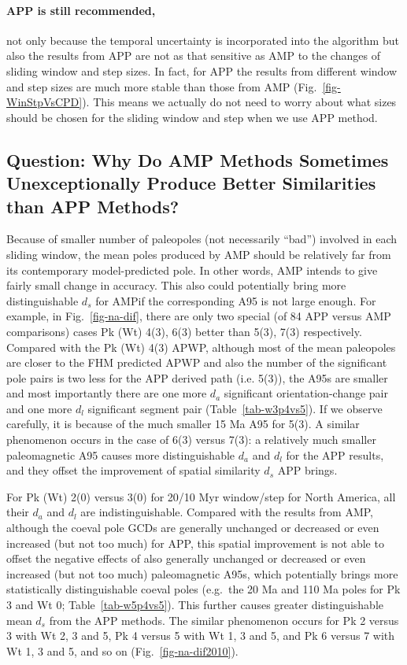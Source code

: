 \paragraph{APP is still recommended,} not only because the temporal uncertainty
is incorporated into the algorithm but also the results from APP are not as that
sensitive as AMP to the changes of sliding window and step sizes. In fact, for
APP the results from different window and step sizes are much more stable than
those from AMP (Fig.~\ref{fig-WinStpVsCPD}). This means we actually do not need
to worry about what sizes should be chosen for the sliding window and step when
we use APP method.

\subsection{Question: Why Do AMP Methods Sometimes Unexceptionally Produce
Better Similarities than APP Methods?}

Because of smaller number of paleopoles (not necessarily ``bad'') involved in
each sliding window, the mean poles produced by AMP should be relatively far
from its contemporary model-predicted pole. In other words, AMP intends to give
fairly small change in accuracy. This also could potentially bring more
distinguishable $d_s$ for AMP\@ if the corresponding A95 is not large enough.
For example, in Fig.~\ref{fig-na-dif}, there are only two special (of 84 APP
versus AMP comparisons) cases Pk (Wt) 4(3), 6(3) better than 5(3), 7(3)
respectively. Compared with the Pk (Wt) 4(3) APWP, although most of the mean
paleopoles are closer to the FHM predicted APWP and also the number of the
significant pole pairs is two less for the APP derived path (i.e. 5(3)), the
A95s are smaller and most importantly there are one more $d_a$ significant
orientation-change pair and one more $d_l$ significant segment pair
(Table~\ref{tab-w3p4vs5}). If we observe carefully, it is because of the much
smaller 15 Ma A95 for 5(3). A similar phenomenon occurs in the case of 6(3)
versus 7(3): a relatively much smaller paleomagnetic A95 causes more
distinguishable $d_a$ and $d_l$ for the APP results, and they offset the
improvement of spatial similarity $d_s$ APP brings.

For Pk (Wt) 2(0) versus 3(0) for 20/10 Myr window/step for North America, all
their $d_a$ and $d_l$ are indistinguishable. Compared with the results from AMP,
although the coeval pole GCDs are generally unchanged or decreased or even
increased (but not too much) for APP, this spatial improvement is not able to
offset the negative effects of also generally unchanged or decreased or even
increased (but not too much) paleomagnetic A95s, which potentially brings more
statistically distinguishable coeval poles (e.g.\ the 20 Ma and 110 Ma poles for
Pk 3 and Wt 0; Table~\ref{tab-w5p4vs5}). This further causes greater
distinguishable mean $d_s$ from the APP methods. The similar phenomenon occurs
for Pk 2 versus 3 with Wt 2, 3 and 5, Pk 4 versus 5 with Wt 1, 3 and 5, and Pk 6
versus 7 with Wt 1, 3 and 5, and so on (Fig.~\ref{fig-na-dif2010}).

